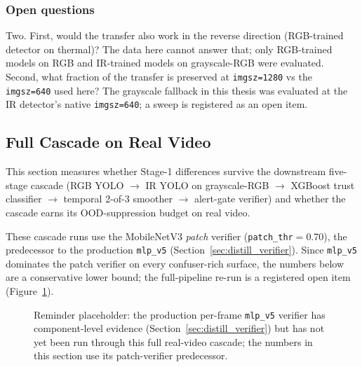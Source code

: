 \subsubsection{Open questions}

Two. First, would the transfer also work in the reverse direction (RGB-trained detector on thermal)? The data here cannot answer that; only RGB-trained models on RGB and IR-trained models on grayscale-RGB were evaluated. Second, what fraction of the transfer is preserved at \texttt{imgsz=1280} vs the \texttt{imgsz=640} used here? The grayscale fallback in this thesis was evaluated at the IR detector's native \texttt{imgsz=640}; a sweep is registered as an open item.

\subsection{Full Cascade on Real Video}
\label{sec:realvideo_cascade}

This section measures whether Stage-1 differences survive the downstream five-stage cascade (RGB YOLO $\to$ IR YOLO on grayscale-RGB $\to$ XGBoost trust classifier $\to$ temporal 2-of-3 smoother $\to$ alert-gate verifier) and whether the cascade earns its OOD-suppression budget on real video.

These cascade runs use the MobileNetV3 \emph{patch} verifier (\texttt{patch\_thr}$=$0.70), the predecessor to the production \texttt{mlp\_v5} (Section~\ref{sec:distill_verifier}). Since \texttt{mlp\_v5} dominates the patch verifier on every confuser-rich surface, the numbers below are a conservative lower bound; the full-pipeline re-run is a registered open item (Figure~\ref{fig:mlp_pipeline_placeholder}).

\begin{figure}[htbp]
    \centering
    \caption{Reminder placeholder: the production per-frame \texttt{mlp\_v5} verifier has component-level evidence (Section~\ref{sec:distill_verifier}) but has not yet been run through this full real-video cascade; the numbers in this section use its patch-verifier predecessor.}
    \label{fig:mlp_pipeline_placeholder}
\end{figure}

